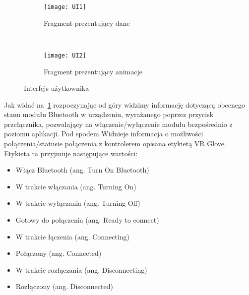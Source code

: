 \begin{figure}[h]
\centering
	\begin{subfigure}[b]{0.45\textwidth}
	\texttt{[image: UI1]}
	\caption{Fragment prezentujący dane}
	\label{fig:ifceDane}
	\end{subfigure}
	~
	\begin{subfigure}[b]{0.45\textwidth}
	\texttt{[image: UI2]}
	\caption{Fragment prezentujący animacje}
	\label{fig:ifceAnimacja}
	\end{subfigure}
\caption{Interfejs użytkownika}
\label{fig:ifce}
\end{figure}

Jak widać na~\ref{fig:ifceDane} rozpoczynając od góry widzimy informację dotyczącą obecnego stanu modułu Bluetooth w urządzeniu, wyrażanego poprzez przycisk przełącznika, pozwalający na włączenie/wyłączenie modułu bezpośrednio z poziomu aplikacji. Pod spodem Widnieje informacja o możliwości połączenia/statusie połączenia z kontrolerem opisana etykietą VR Glove. Etykieta ta przyjmuje następujące wartości:
\begin{itemize}
\item Włącz Bluetooth (ang. Turn On Bluetooth)
\item W trakcie włączania (ang. Turning On)
\item W trakcie wyłączania (ang. Turning Off)
\item Gotowy do połączenia (ang. Ready to connect)
\item W trakcie łączenia (ang. Connecting)
\item Połączony (ang. Connected)
\item W trakcie rozłączania (ang. Disconnecting)
\item Rozłączony (ang. Disconnected)
\end{itemize}
\label{itm:stany}
